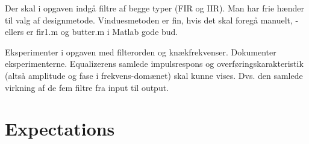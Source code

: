 Der skal i opgaven indgå filtre af begge typer (FIR og IIR). Man har frie hænder til valg af designmetode. Vinduesmetoden er fin, hvis det skal foregå manuelt, - ellers er fir1.m og butter.m i Matlab gode bud.

Eksperimenter i opgaven med filterorden og knækfrekvenser. Dokumenter eksperimenterne. Equalizerens samlede impulsrespons og overføringskarakteristik (altså amplitude og fase i frekvens-domænet) skal kunne vises. Dvs. den samlede virkning af de fem filtre fra input til output.



\section{Expectations}
